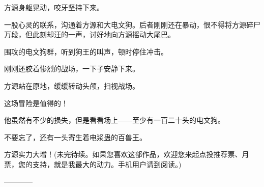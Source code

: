 \begin{this_body}
方源身躯晃动，咬牙坚持下来。

一股心灵的联系，沟通着方源和大电文狗。后者刚刚还在暴动，恨不得将方源碎尸万段，但此刻却汪的一声，讨好地向方源摇动大尾巴。

围攻的电文狗群，听到狗王的叫声，顿时停住冲击。

刚刚还胶着惨烈的战场，一下子安静下来。

方源站在原地，缓缓转动头颅，扫视战场。

这场冒险是值得的！

他虽然有不少的损失，但是看看场上――至少有一百二十头的电文狗。

不要忘了，还有一头寄生着电浆蛊的百兽王。

方源实力大增！(未完待续。如果您喜欢这部作品，欢迎您来起点投推荐票、月票，您的支持，就是我最大的动力。手机用户请到阅读。)

------------

\end{this_body}

